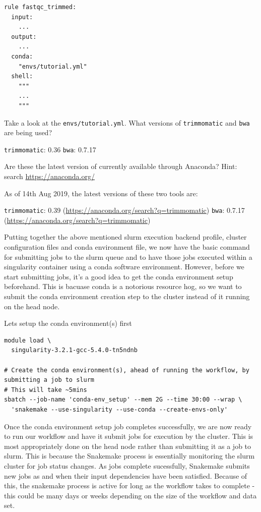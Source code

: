 \begin{lstlisting}
rule fastqc_trimmed:
  input:
    ...
  output:
    ...
  conda:
    "envs/tutorial.yml"
  shell:
    """
    ...
    """
\end{lstlisting}

\begin{questions}

Take a look at the \texttt{envs/tutorial.yml}. What versions of \texttt{trimmomatic} and \texttt{bwa} are being used?

\begin{answer}
\texttt{trimmomatic}: 0.36
\texttt{bwa}: 0.7.17
\end{answer}

Are these the latest version of currently available through Anaconda? Hint: search \url{https://anaconda.org/}

\begin{answer}
As of 14th Aug 2019, the latest versions of these two tools are:

\texttt{trimmomatic}: 0.39 (\url{https://anaconda.org/search?q=trimmomatic})
\texttt{bwa}: 0.7.17 (\url{https://anaconda.org/search?q=trimmomatic})
\end{answer}

\end{questions}

Putting together the above mentioned slurm execution backend profile, cluster configuration files and conda environment file, we
now have the basic command for submitting jobs to the slurm queue and to have those jobs executed within a singularity container using
a conda software environment. However, before we start submitting jobs, it's a good idea to get the conda environment setup beforehand.
This is bacuase conda is a notorious resource hog, so we want to submit the conda environment creation step to the cluster instead of
it running on the head node.

Lets setup the conda environment(s) first

\begin{lstlisting}
module load \
  singularity-3.2.1-gcc-5.4.0-tn5ndnb

# Create the conda environment(s), ahead of running the workflow, by submitting a job to slurm
# This will take ~5mins
sbatch --job-name 'conda-env_setup' --mem 2G --time 30:00 --wrap \
  'snakemake --use-singularity --use-conda --create-envs-only'
\end{lstlisting}

Once the conda environment setup job completes successfully, we are now ready to run our workflow and have it submit jobs for execution by the
cluster. This is most appropriately done on the head node rather than submitting it as a job to slurm. This is because the Snakemake process is
essentially monitoring the slurm cluster for job status changes. As jobs complete sucessfully, Snakemake submits new jobs as and when their input
dependencies have been satisfied. Because of this, the snakemake process is active for long as the workflow takes to complete - this could be
many days or weeks depending on the size of the workflow and data set.

